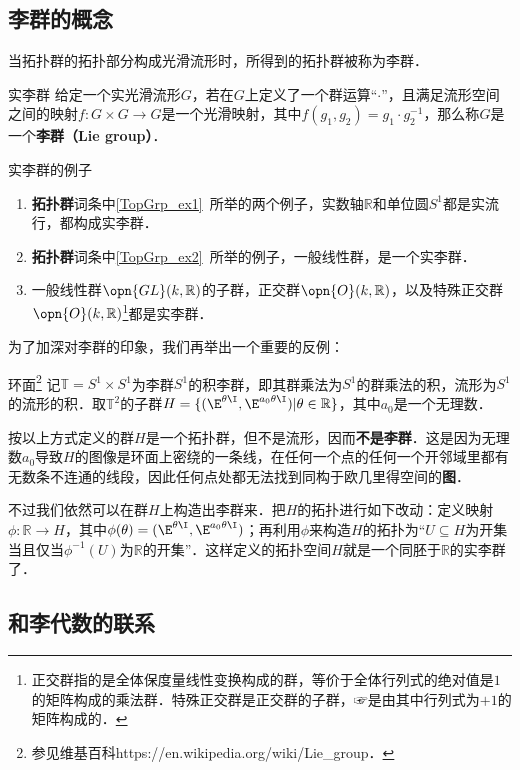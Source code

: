 

\subsection{李群的概念}

当拓扑群的拓扑部分构成光滑流形时，所得到的拓扑群被称为李群．

\begin{definition}{实李群}
给定一个实光滑流形$G$，若在$G$上定义了一个群运算“$\cdot$”，且满足流形空间之间的映射$f:G\times G\rightarrow G$是一个光滑映射，其中$f(g_1, g_2)=g_1\cdot g_2^{-1}$，那么称$G$是一个\textbf{李群（Lie group）}．
\end{definition}

\begin{example}{实李群的例子}
\begin{enumerate}
\item \textbf{拓扑群}词条中\autoref{TopGrp_ex1}~所举的两个例子，实数轴$\mathbb{R}$和单位圆$S^1$都是实流行，都构成实李群．
\item \textbf{拓扑群}词条中\autoref{TopGrp_ex2}~所举的例子，一般线性群，是一个实李群．
\item 一般线性群$\opn{GL}(k, \mathbb{R})$的子群，正交群$\opn{O}(k, \mathbb{R})$，以及特殊正交群$\opn{O}(k, \mathbb{R})$\footnote{正交群指的是全体保度量线性变换构成的群，等价于全体行列式的绝对值是$1$的矩阵构成的乘法群．特殊正交群是正交群的子群，☞是由其中行列式为$+1$的矩阵构成的．}都是实李群．
\end{enumerate}
\end{example}

为了加深对李群的印象，我们再举出一个重要的反例：

\begin{definition}{环面\footnote{参见维基百科https://en.wikipedia.org/wiki/Lie_group．}}
记$\mathbb{T}=S^1\times S^1$为李群$S^1$的积李群，即其群乘法为$S^1$的群乘法的积，流形为$S^1$的流形的积．取$\mathbb{T}^2$的子群$H=\{(\E^{\theta\I}, \E^{a_0\theta\I})|\theta\in\mathbb{R}\}$，其中$a_0$是一个无理数．

按以上方式定义的群$H$是一个拓扑群，但不是流形，因而\textbf{不是李群}．这是因为无理数$a_0$导致$H$的图像是环面上密绕的一条线，在任何一个点的任何一个开邻域里都有无数条不连通的线段，因此任何点处都无法找到同构于欧几里得空间的\textbf{图}．

不过我们依然可以在群$H$上构造出李群来．把$H$的拓扑进行如下改动：定义映射$\phi:\mathbb{R}\to H$，其中$\phi(\theta)=(\E^{\theta\I}, \E^{a_0\theta\I})$；再利用$\phi$来构造$H$的拓扑为“$U\subseteq H$为开集当且仅当$\phi^{-1}(U)$为$\mathbb{R}$的开集”．这样定义的拓扑空间$H$就是一个同胚于$\mathbb{R}$的实李群了．
\end{definition}






\subsection{和李代数的联系}



